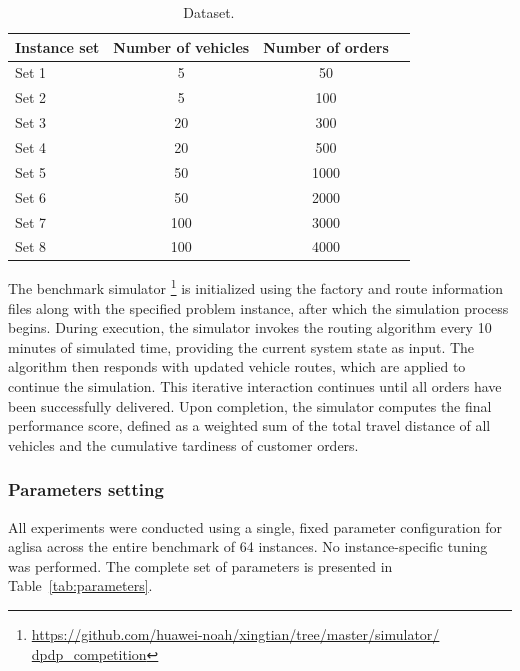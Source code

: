 \documentclass[pdflatex]{sn-jnl}
\begin{document}
\begin{table}
\centering
\caption{Dataset.}\label{tab:dataset_settings}
\begin{tabular}{lccc}
\hline
\textbf{Instance set}  & \textbf{Number of vehicles} & \textbf{Number of orders} \\ 
\hline
Set 1 & 5 & 50 \\
Set 2  & 5 & 100 \\
Set 3 & 20 & 300 \\
Set 4  & 20 & 500 \\
Set 5  & 50 & 1000 \\
Set 6  & 50 & 2000 \\
Set 7  & 100 & 3000 \\
Set 8  & 100 & 4000 \\
\hline
\end{tabular}%
\end{table}



The benchmark simulator \footnote{\hyperlink{https://github.com/huawei-noah/xingtian/tree/master/simulator/
dpdp_competition}{https://github.com/huawei-noah/xingtian/tree/master/simulator/
dpdp\_competition}} is initialized using the factory and route information files along with the specified problem instance, after which the simulation process begins. During execution, the simulator invokes the routing algorithm every 10 minutes of simulated time, providing the current system state as input. The algorithm then responds with updated vehicle routes, which are applied to continue the simulation. This iterative interaction continues until all orders have been successfully delivered. Upon completion, the simulator computes the final performance score, defined as a weighted sum of the total travel distance of all vehicles and the cumulative tardiness of customer orders. 

\subsubsection{Parameters setting} \label{ss:exp-params}

All experiments were conducted using a single, fixed parameter configuration for \gls{aglisa} across the entire benchmark of 64 instances. No instance-specific tuning was performed. The complete set of parameters is presented in Table~\ref{tab:parameters}.
\end{document}
